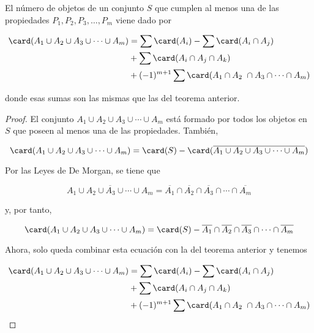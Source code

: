 \begin{corollary}
  El número de objetos de un conjunto $S$ que cumplen al menos una de las
  propiedades $P_1, P_2, P_3, \ldots, P_m$ viene dado por

  \begin{alignat*}{2}
  \card(A_1 \cup A_2 \cup A_3 \cup \cdots \cup A_m)
    &= \sum \card(A_i) - \sum \card(A_i \cap A_j) \\
    &+ \sum \card(A_i \cap A_j \cap A_k) \\
    &+ ({-1})^{m+1} \sum \card(A_1 \cap A_2 \cap A_3 \cap \cdots \cap A_m)
  \end{alignat*}

  \noindent donde esas sumas son las mismas que las del teorema anterior.
\end{corollary}

\begin{proof}
  El conjunto $A_1 \cup A_2 \cup A_3 \cup \cdots \cup A_m$ está formado por
  todos los objetos en $S$ que poseen al menos una de las propiedades.
  También,

  $$ \card(A_1 \cup A_2 \cup A_3 \cup \cdots \cup A_m) = \card(S) -
  \card(\overline{A_1 \cup A_2 \cup A_3 \cup \cdots \cup A_m}) $$

  Por las Leyes de De Morgan, se tiene que

  $$ \overline{A_1 \cup A_2 \cup A_3 \cup \cdots \cup A_m} = \overline{A_1}
  \cap \overline{A_2} \cap \overline{A_3} \cap \cdots \cap \overline{A_m} $$

  \noindent y, por tanto,

  $$ \card(A_1 \cup A_2 \cup A_3 \cup \cdots \cup A_m) = \card(S) -
  \overline{A_1} \cap \overline{A_2} \cap \overline{A_3} \cap \cdots \cap
  \overline{A_m} $$

  Ahora, solo queda combinar esta ecuación con la del teorema anterior y
  tenemos

  \begin{alignat*}{2}
  \card(A_1 \cup A_2 \cup A_3 \cup \cdots \cup A_m)
    &= \sum \card(A_i) - \sum \card(A_i \cap A_j) \\
    &+ \sum \card(A_i \cap A_j \cap A_k) \\
    &+ ({-1})^{m+1} \sum \card(A_1 \cap A_2 \cap A_3 \cap \cdots \cap A_m)
  \end{alignat*}
\end{proof}














